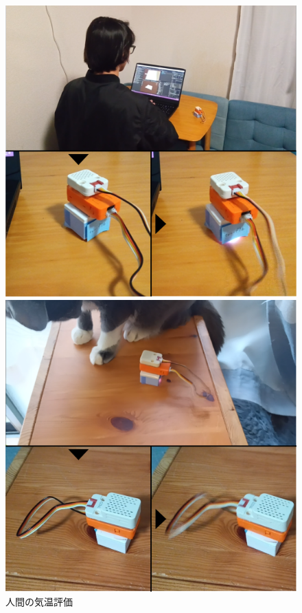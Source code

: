 \documentclass[paper=a4paper,jafontsize=9pt,head_space=15mm,gutter=20mm,twocolumn,number_of_lines=49,
line_length=26zw]{myuarticle}
\begin{document}
\begin{figure}[hb]
  \begin{center}
    \begin{minipage}[b]{0.24\textwidth}
      \centering
      \includegraphics[keepaspectratio, scale=0.1]{resources/human.png}
      \caption{人間の気温評価}
    \end{minipage}
    \begin{minipage}[b]{0.24\textwidth}
      \centering
      \includegraphics[keepaspectratio, scale=0.1]{resources/cat.png}

\end{minipage}
\end{center}
\end{figure}
\end{document}
